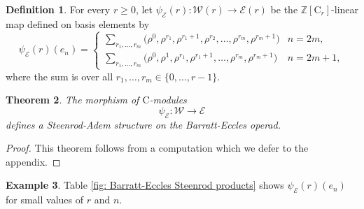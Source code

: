 \documentclass[A4]{amsart}
\newtheorem{theorem}{Theorem}
\theoremstyle{definition}
\newtheorem{definition}[theorem]{Definition}
\newtheorem{example}[theorem]{Example}
\newcommand{\Z}{\mathbb{Z}}
\begin{document}
\begin{definition} \label{def: Steenrod-Adem on Barratt-Eccles}
	For every $r \geq 0$, let $\psi_{\mathcal E}(r) : \mathcal W(r) \to \mathcal E(r)$ be the $\Z[\mathrm{C}_r]$-linear map defined on basis elements by 
	\begin{equation*}
	\psi_{\mathcal E}(r)(e_{n}) = \begin{cases}
	\displaystyle{\sum_{r_1, \dots, r_m}} \big(\rho^0, \rho^{r_1}, \rho^{r_1+1}, \rho^{r_2}, \dots, \rho^{r_{m}}, \rho^{r_{m}+1} \big) & n = 2m, \\
	\displaystyle{\sum_{r_1, \dots, r_m}} \big(\rho^0, \rho^1, \rho^{r_1}, \rho^{r_1+1}, \dots, \rho^{r_{m}}, \rho^{r_{m}+1} \big) & n = 2m+1,
	\end{cases}
	\end{equation*}
	where the sum is over all $r_1, \dots, r_m \in \{0, \dots, r-1\}$.
\end{definition}

\begin{theorem} \label{thm: Steenrod-Adem on Barratt-Eccles}
	The morphism of $\mathrm{C}$-modules
	\begin{equation*}
	\psi_{\mathcal E} \colon \mathcal W \to \mathcal E
	\end{equation*}
	defines a Steenrod-Adem structure on the Barratt-Eccles operad.
\end{theorem}

\begin{proof}
	This theorem follows from a computation which we defer to the appendix.
\end{proof}

\begin{example}
	Table \ref{fig: Barratt-Eccles Steenrod products} shows $\psi_{\mathcal E}(r)(e_n)$ for small values of $r$ and $n$.
\end{example}
\end{document}
